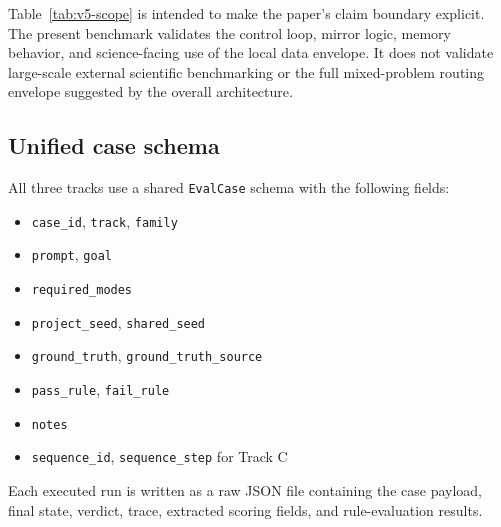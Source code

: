 \documentclass[12pt]{article}
\begin{document}
\begin{table}[H]
\centering
{}
\caption{Table 7. Implemented, exercised, and deferred scope. This table separates the full system envelope from the subset actually validated by the present benchmark.}
\label{tab:v5-scope}
\end{table}

Table~\ref{tab:v5-scope} is intended to make the paper's claim boundary explicit. The present benchmark validates the control loop, mirror logic, memory behavior, and science-facing use of the local data envelope. It does not validate large-scale external scientific benchmarking or the full mixed-problem routing envelope suggested by the overall architecture.

\subsection{Unified case schema}

All three tracks use a shared \texttt{EvalCase} schema with the following fields:
\begin{itemize}
\item \texttt{case\_id}, \texttt{track}, \texttt{family}
\item \texttt{prompt}, \texttt{goal}
\item \texttt{required\_modes}
\item \texttt{project\_seed}, \texttt{shared\_seed}
\item \texttt{ground\_truth}, \texttt{ground\_truth\_source}
\item \texttt{pass\_rule}, \texttt{fail\_rule}
\item \texttt{notes}
\item \texttt{sequence\_id}, \texttt{sequence\_step} for Track C
\end{itemize}
Each executed run is written as a raw JSON file containing the case payload, final state, verdict, trace, extracted scoring fields, and rule-evaluation results.
\end{document}
